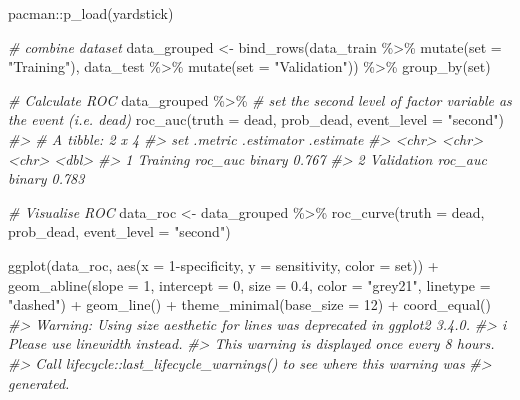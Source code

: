 \documentclass[
]{article}
\newenvironment{Shaded}{\begin{snugshade}}{\end{snugshade}}
\newcommand{\AttributeTok}[1]{\textcolor[rgb]{0.77,0.63,0.00}{#1}}
\newcommand{\CommentTok}[1]{\textcolor[rgb]{0.56,0.35,0.01}{\textit{#1}}}
\newcommand{\DecValTok}[1]{\textcolor[rgb]{0.00,0.00,0.81}{#1}}
\newcommand{\FloatTok}[1]{\textcolor[rgb]{0.00,0.00,0.81}{#1}}
\newcommand{\FunctionTok}[1]{\textcolor[rgb]{0.00,0.00,0.00}{#1}}
\newcommand{\NormalTok}[1]{#1}
\newcommand{\OtherTok}[1]{\textcolor[rgb]{0.56,0.35,0.01}{#1}}
\newcommand{\SpecialCharTok}[1]{\textcolor[rgb]{0.00,0.00,0.00}{#1}}
\newcommand{\StringTok}[1]{\textcolor[rgb]{0.31,0.60,0.02}{#1}}
\begin{document}
\begin{Shaded}
\begin{Highlighting}[]
\NormalTok{pacman}\SpecialCharTok{::}\FunctionTok{p\_load}\NormalTok{(yardstick)}

\CommentTok{\# combine dataset}
\NormalTok{data\_grouped }\OtherTok{\textless{}{-}} \FunctionTok{bind\_rows}\NormalTok{(data\_train }\SpecialCharTok{\%\textgreater{}\%} \FunctionTok{mutate}\NormalTok{(}\AttributeTok{set =} \StringTok{"Training"}\NormalTok{),}
\NormalTok{                      data\_test }\SpecialCharTok{\%\textgreater{}\%} \FunctionTok{mutate}\NormalTok{(}\AttributeTok{set =} \StringTok{"Validation"}\NormalTok{)) }\SpecialCharTok{\%\textgreater{}\%} 
  \FunctionTok{group\_by}\NormalTok{(set)}

\CommentTok{\# Calculate ROC}
\NormalTok{data\_grouped }\SpecialCharTok{\%\textgreater{}\%} 
  \CommentTok{\# set the second level of factor variable as the event (i.e. dead)}
  \FunctionTok{roc\_auc}\NormalTok{(}\AttributeTok{truth =}\NormalTok{ dead, prob\_dead, }\AttributeTok{event\_level =} \StringTok{"second"}\NormalTok{)}
\CommentTok{\#\textgreater{} \# A tibble: 2 x 4}
\CommentTok{\#\textgreater{}   set        .metric .estimator .estimate}
\CommentTok{\#\textgreater{}   \textless{}chr\textgreater{}      \textless{}chr\textgreater{}   \textless{}chr\textgreater{}          \textless{}dbl\textgreater{}}
\CommentTok{\#\textgreater{} 1 Training   roc\_auc binary         0.767}
\CommentTok{\#\textgreater{} 2 Validation roc\_auc binary         0.783}

\CommentTok{\# Visualise ROC}
\NormalTok{data\_roc }\OtherTok{\textless{}{-}}\NormalTok{ data\_grouped }\SpecialCharTok{\%\textgreater{}\%} 
  \FunctionTok{roc\_curve}\NormalTok{(}\AttributeTok{truth =}\NormalTok{ dead, prob\_dead, }\AttributeTok{event\_level =} \StringTok{"second"}\NormalTok{)}

\FunctionTok{ggplot}\NormalTok{(data\_roc, }\FunctionTok{aes}\NormalTok{(}\AttributeTok{x =} \DecValTok{1}\SpecialCharTok{{-}}\NormalTok{specificity, }\AttributeTok{y =}\NormalTok{ sensitivity, }\AttributeTok{color =}\NormalTok{ set)) }\SpecialCharTok{+}
  \FunctionTok{geom\_abline}\NormalTok{(}\AttributeTok{slope =} \DecValTok{1}\NormalTok{, }\AttributeTok{intercept =} \DecValTok{0}\NormalTok{,}
              \AttributeTok{size =} \FloatTok{0.4}\NormalTok{, }\AttributeTok{color =} \StringTok{"grey21"}\NormalTok{, }\AttributeTok{linetype =} \StringTok{"dashed"}\NormalTok{) }\SpecialCharTok{+}
  \FunctionTok{geom\_line}\NormalTok{() }\SpecialCharTok{+}
  \FunctionTok{theme\_minimal}\NormalTok{(}\AttributeTok{base\_size =} \DecValTok{12}\NormalTok{) }\SpecialCharTok{+}
  \FunctionTok{coord\_equal}\NormalTok{()}
\CommentTok{\#\textgreater{} Warning: Using \textasciigrave{}size\textasciigrave{} aesthetic for lines was deprecated in ggplot2 3.4.0.}
\CommentTok{\#\textgreater{} i Please use \textasciigrave{}linewidth\textasciigrave{} instead.}
\CommentTok{\#\textgreater{} This warning is displayed once every 8 hours.}
\CommentTok{\#\textgreater{} Call \textasciigrave{}lifecycle::last\_lifecycle\_warnings()\textasciigrave{} to see where this warning was}
\CommentTok{\#\textgreater{} generated.}
\end{Highlighting}
\end{Shaded}
\end{document}
